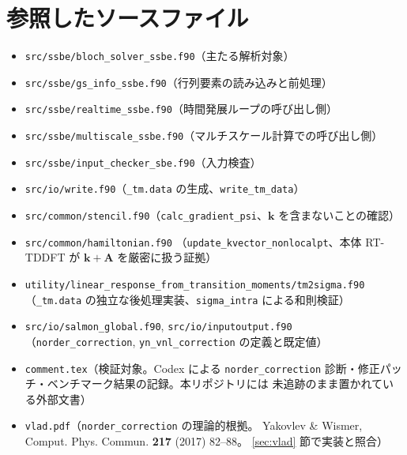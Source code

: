 \documentclass[dvipdfmx,a4paper,11pt]{jsarticle}
\newcommand{\file}[1]{\texttt{#1}}
\newcommand{\vk}{\bm{k}}
\newcommand{\vA}{\bm{A}}
\begin{document}
\section*{参照したソースファイル}

\begin{itemize}
\item \file{src/ssbe/bloch\_solver\_ssbe.f90}（主たる解析対象）
\item \file{src/ssbe/gs\_info\_ssbe.f90}（行列要素の読み込みと前処理）
\item \file{src/ssbe/realtime\_ssbe.f90}（時間発展ループの呼び出し側）
\item \file{src/ssbe/multiscale\_ssbe.f90}（マルチスケール計算での呼び出し側）
\item \file{src/ssbe/input\_checker\_sbe.f90}（入力検査）
\item \file{src/io/write.f90}（\file{\_tm.data} の生成、\verb|write_tm_data|）
\item \file{src/common/stencil.f90}（\verb|calc_gradient_psi|、$\vk$ を含まないことの確認）
\item \file{src/common/hamiltonian.f90}
      （\verb|update_kvector_nonlocalpt|、本体 RT-TDDFT が $\vk+\vA$ を厳密に扱う証拠）
\item \file{utility/linear\_response\_from\_transition\_moments/tm2sigma.f90}
      （\file{\_tm.data} の独立な後処理実装、\verb|sigma_intra| による和則検証）
\item \file{src/io/salmon\_global.f90}, \file{src/io/inputoutput.f90}
      （\file{norder\_correction}, \file{yn\_vnl\_correction} の定義と既定値）
\item \file{comment.tex}（検証対象。Codex による \file{norder\_correction}
      診断・修正パッチ・ベンチマーク結果の記録。本リポジトリには
      未追跡のまま置かれている外部文書）
\item \file{vlad.pdf}（\file{norder\_correction} の理論的根拠。
      Yakovlev \& Wismer, Comput. Phys. Commun. \textbf{217} (2017) 82--88。
      \ref{sec:vlad} 節で実装と照合）
\end{itemize}
\end{document}
